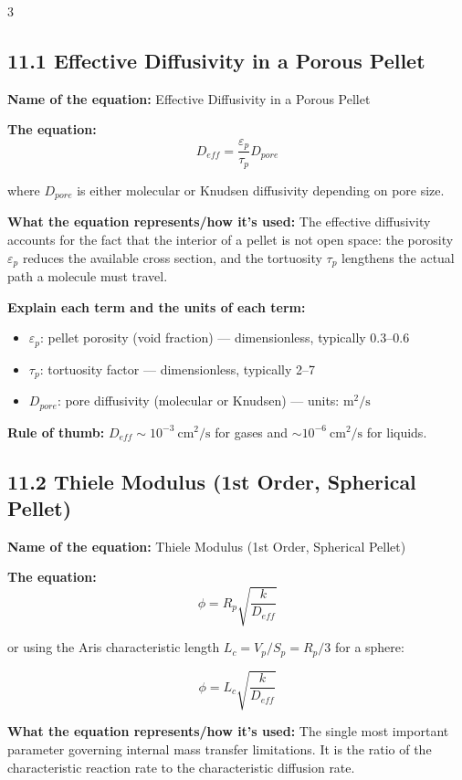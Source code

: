 \documentclass[8pt]{extarticle}
\begin{document}
\begin{multicols*}{3}
\subsection*{11.1 Effective Diffusivity in a Porous Pellet}

\textbf{Name of the equation:} Effective Diffusivity in a Porous Pellet

\textbf{The equation:}
\[
D_{eff}=\frac{\varepsilon_p}{\tau_p}D_{pore}
\]

where \(D_{pore}\) is either molecular or Knudsen diffusivity depending on pore size.

\textbf{What the equation represents/how it's used:} The effective diffusivity accounts for the fact that the interior of a pellet is not open space: the porosity \(\varepsilon_p\) reduces the available cross section, and the tortuosity \(\tau_p\) lengthens the actual path a molecule must travel.

\textbf{Explain each term and the units of each term:}
\begin{itemize}
\item \(\varepsilon_p\): pellet porosity (void fraction) --- dimensionless, typically 0.3--0.6
\item \(\tau_p\): tortuosity factor --- dimensionless, typically 2--7
\item \(D_{pore}\): pore diffusivity (molecular or Knudsen) --- units: \(\mathrm{m^2/s}\)
\end{itemize}

\textbf{Rule of thumb:} \(D_{eff}\sim 10^{-3}\ \mathrm{cm^2/s}\) for gases and \(\sim 10^{-6}\ \mathrm{cm^2/s}\) for liquids.

\subsection*{11.2 Thiele Modulus (1st Order, Spherical Pellet)}

\textbf{Name of the equation:} Thiele Modulus (1st Order, Spherical Pellet)

\textbf{The equation:}
\[
\phi=R_p\sqrt{\frac{k}{D_{eff}}}
\]

or using the Aris characteristic length \(L_c=V_p/S_p=R_p/3\) for a sphere:

\[
\phi=L_c\sqrt{\frac{k}{D_{eff}}}
\]

\textbf{What the equation represents/how it's used:} The single most important parameter governing internal mass transfer limitations. It is the ratio of the characteristic reaction rate to the characteristic diffusion rate.


\end{multicols*}
\end{document}
